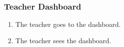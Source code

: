 \subsubsection{Teacher Dashboard}

\begin{enumerate}
    \item The teacher goes to the dashboard.
    \item The teacher sees the dashboard.
\end{enumerate}
